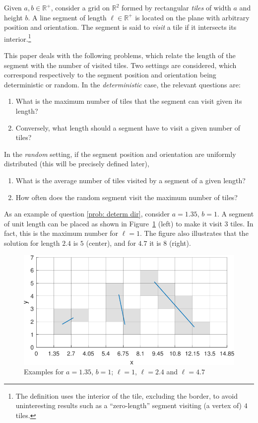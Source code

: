 \documentclass[12pt, a4paper]{article}
\makeatletter
\newcommand{\len}{\ell} %
\renewcommand\theenumi{(\@roman\c@enumi)} %
\renewcommand\labelenumi{\theenumi} %
\makeatother
\begin{document}
Given $a, b \in \mathbb R^+$, consider a grid on $\mathbb R^2$ formed by rectangular \emph{tiles} of width $a$ and height $b$. A line segment of length $\len \in \mathbb R^+$ is located on the plane with arbitrary position and orientation. The segment is said to \emph{visit} a tile if it intersects its interior.\footnote{
The definition uses the interior of the tile, excluding the border, to avoid uninteresting results such as a ``zero-length'' segment visiting (a vertex of) $4$ tiles.}

This paper deals with the following problems, which relate the length of the segment with the number of visited tiles. Two settings are considered, which correspond respectively to the segment position and orientation being deterministic or random. In the \emph{deterministic} case, the relevant questions are:
\begin{enumerate}
\renewcommand{\labelenumi}{(1\alph{enumi})}
\renewcommand{\theenumi}{(1\alph{enumi})}
\item
\label{prob: determ dir}
What is the maximum number of tiles that the segment can visit given its length?
\item
\label{prob: determ inv}
Conversely, what length should a segment have to visit a given number of tiles?
\end{enumerate}

In the \emph{random} setting, if the segment position and orientation are uniformly distributed (this will be precisely defined later),
\begin{enumerate}
\renewcommand{\labelenumi}{(2\alph{enumi})}
\renewcommand{\theenumi}{(2\alph{enumi})}
\item
\label{prob: rand ave}
What is the average number of tiles visited by a segment of a given length?
\item
\label{prob: rand prob}
How often does the random segment visit the maximum number of tiles?
\end{enumerate}

As an example of question \ref{prob: determ dir}, consider $a=1.35$, $b=1$. A segment of unit length can be placed as shown in Figure~\ref{fig: examples} (left) to make it visit $3$ tiles. In fact, this is the maximum number for $\len=1$. The figure also illustrates that the solution for length $2.4$ is $5$ (center), and for $4.7$ it is $8$ (right).

\begin{figure}
\centering%
\includegraphics[width=.85\textwidth]{examples_1p35}%
\caption{Examples for $a=1.35$, $b=1$; $\len=1$, $\len=2.4$ and $\len=4.7$
}%
\label{fig: examples}%
\end{figure}%
\end{document}
